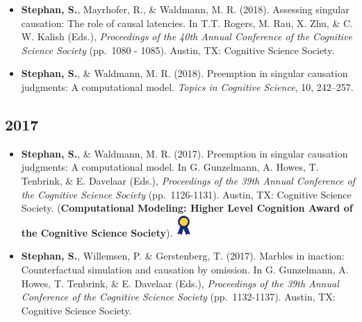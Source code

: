 \documentclass[
]{article}
\begin{document}
\begin{itemize}
\item
  \textbf{Stephan, S.}, Mayrhofer, R., \& Waldmann, M. R. (2018).
  Assessing singular causation: The role of causal latencies. In T.T.
  Rogers, M. Rau, X. Zhu, \& C. W. Kalish (Eds.), \emph{Proceedings of
  the 40th Annual Conference of the Cognitive Science Society} (pp.~1080
  - 1085). Austin, TX: Cognitive Science Society.
  {\href{publications/Stephan-Mayrhofer-Waldmann-2018-_SingularCausationLatency.pdf}{}}
\item
  \textbf{Stephan, S.}, \& Waldmann, M. R. (2018). Preemption in
  singular causation judgments: A computational model. \emph{Topics in
  Cognitive Science}, 10, 242--257.
  {\href{https://onlinelibrary.wiley.com/doi/epdf/10.1111/tops.12309}{}}
\end{itemize}

\hypertarget{section-10}{%
\subsection{2017}\label{section-10}}

\begin{itemize}
\item
  \textbf{Stephan, S.}, \& Waldmann, M. R. (2017). Preemption in
  singular causation judgments: A computational model. In G. Gunzelmann,
  A. Howes, T. Tenbrink, \& E. Davelaar (Eds.), \emph{Proceedings of the
  39th Annual Conference of the Cognitive Science Society}
  (pp.~1126-1131). Austin, TX: Cognitive Science Society.
  (\textbf{Computational Modeling: Higher Level Cognition Award of the
  Cognitive Science Society}).
  {\includegraphics{images/home/Lit_award_icon.png}}
  {\href{publications/Stephan-Waldmann-2017-_Preemption\%20in\%20singular\%20causation\%20judgments-A\%20computational\%20model.pdf}{}}
\item
  \textbf{Stephan, S.}, Willemsen, P. \& Gerstenberg, T. (2017). Marbles
  in inaction: Counterfactual simulation and causation by omission. In
  G. Gunzelmann, A. Howes, T. Tenbrink, \& E. Davelaar (Eds.),
  \emph{Proceedings of the 39th Annual Conference of the Cognitive
  Science Society} (pp.~1132-1137). Austin, TX: Cognitive Science
  Society.
  {\href{publications/Stephan-Willemsen-Gerstenberg-2017-_omissions.pdf}{}}
\end{itemize}
\end{document}
